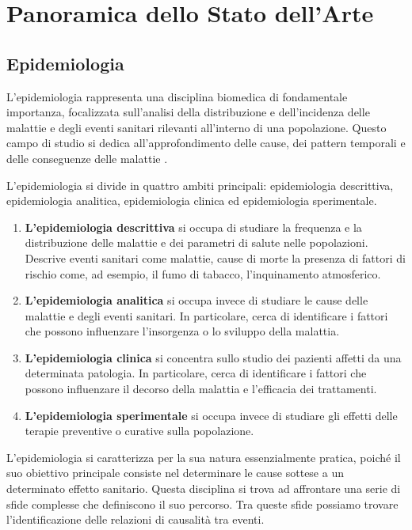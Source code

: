 \section{Panoramica dello Stato dell'Arte}

\subsection{Epidemiologia}
L'epidemiologia rappresenta una disciplina biomedica di fondamentale 
importanza, focalizzata sull'analisi della distribuzione e dell'incidenza 
delle malattie e degli eventi sanitari rilevanti all'interno di una 
popolazione. Questo campo di studio si dedica all'approfondimento 
delle cause, dei pattern temporali e delle conseguenze delle malattie 
\cite{Galea2009-lj} \cite{Parascandola2001-kw}.

L’epidemiologia si divide in quattro ambiti principali: epidemiologia
descrittiva, epidemiologia analitica, epidemiologia clinica ed epidemiologia
sperimentale.

\begin{enumerate}
    \item \textbf{L’epidemiologia descrittiva} si occupa di studiare la
    frequenza e la distribuzione delle malattie e dei parametri di salute
    nelle popolazioni. Descrive eventi sanitari come malattie, cause di morte 
    la presenza di fattori di rischio come, ad esempio, il fumo di tabacco,
    l’inquinamento atmosferico.
    \item \textbf{L’epidemiologia analitica} si occupa invece di studiare le
    cause delle malattie e degli eventi sanitari. In particolare, cerca di 
    identificare i fattori che possono influenzare l’insorgenza o lo sviluppo
    della malattia.
    \item \textbf{L’epidemiologia clinica} si concentra sullo studio dei
    pazienti affetti da una determinata patologia. In particolare, cerca di
    identificare i fattori che possono influenzare il decorso della malattia
    e l’efficacia dei trattamenti.
    \item \textbf{L’epidemiologia sperimentale} si occupa invece di studiare 
    gli effetti delle terapie preventive o curative sulla popolazione.
\end{enumerate}

L'epidemiologia si caratterizza per la sua natura essenzialmente 
pratica, poiché il suo obiettivo principale consiste nel determinare 
le cause sottese a un determinato effetto sanitario. Questa disciplina 
si trova ad affrontare una serie di sfide complesse che definiscono 
il suo percorso. Tra queste sfide possiamo trovare l'identificazione 
delle relazioni di causalità tra eventi.

